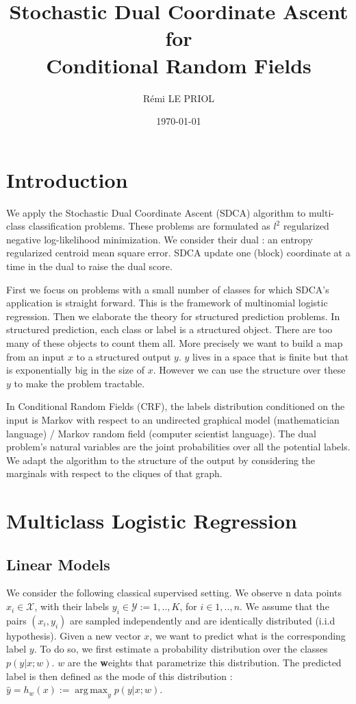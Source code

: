 \documentclass{article}
\title{Stochastic Dual Coordinate Ascent \\ for \\ Conditional Random Fields}
\author{R\'emi LE PRIOL}
\date{\today}
\DeclareMathOperator{\1}{\mathbb{1}}
\DeclareMathOperator*{\argmax}{arg\,max}
\begin{document}
\maketitle

\section*{Introduction}

We apply the Stochastic Dual Coordinate Ascent (SDCA) algorithm to multi-class classification problems.
These problems are formulated as $l^2$ regularized negative log-likelihood minimization. 
We consider their dual : an entropy regularized centroid mean square error.
SDCA update one (block) coordinate at a time in the dual to raise the dual score.
  
First we focus on problems with a small number of classes for which SDCA's application is straight forward.
This is the framework of multinomial logistic regression.
Then we elaborate the theory for structured prediction problems.
In structured prediction, each class or label is a structured object.
There are too many of these objects to count them all.
More precisely we want to build a map from an input $x$ to a structured output $y$.
$y$ lives in a space that is finite but that is exponentially big in the size of $x$.
However we can use the structure over these $y$ to make the problem tractable.

In Conditional Random Fields (CRF), the labels distribution conditioned on the input is Markov with respect to an undirected graphical model (mathematician language) / Markov random field (computer scientist language). 
The dual problem's natural variables are the joint probabilities over all the potential labels.
We adapt the algorithm to the structure of the output by considering the marginals with respect to the cliques of that graph.

\section{Multiclass Logistic Regression}

\subsection{Linear Models}

We consider the following classical supervised setting.
We observe n data points $x_i \in \mathcal{X}$, with their labels $y_i\in \mathcal{Y}:={1,..,K}$, for $i \in {1,..,n}$.
We assume that the pairs $(x_i, y_i)$ are sampled independently and are identically distributed (i.i.d hypothesis).
Given a new vector $x$, we want to predict what is the corresponding label $y$. 
To do so, we first estimate a probability distribution over the classes $p(y|x ; w)$.
$w$ are the \textbf{w}eights that parametrize this distribution. 
The predicted label is then defined as the mode of this distribution : $\hat y = h_w(x) := \argmax_y p(y| x ; w)$.
\end{document}
